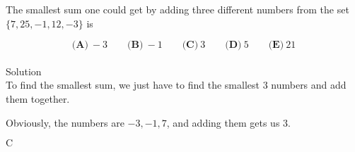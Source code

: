 

The smallest sum one could get by adding three different numbers from the set $ \{7,25,-1,12,-3 \}$ is

\[ \textbf{(A)}\ -3 \qquad
\textbf{(B)}\ -1 \qquad
\textbf{(C)}\ 3 \qquad
\textbf{(D)}\ 5 \qquad
\textbf{(E)}\ 21
\]
\\
Solution
\\
To find the smallest sum, we just have to find the smallest 3 numbers and add them together.

Obviously, the numbers are $-3, -1, 7$, and adding them gets us $3$.

$\boxed{\text{C}}$